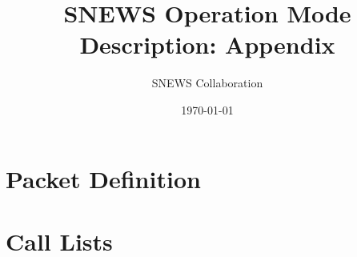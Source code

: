 \documentclass{article}
\begin{document}
\title{SNEWS Operation Mode Description: Appendix}         
\author{SNEWS Collaboration}
\date{\today}
\maketitle

\section{Packet Definition}      


\section{Call Lists}      
\end{document}
